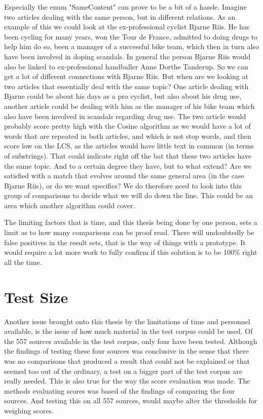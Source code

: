 Especially the enum "SameContent" can prove to be a bit of a hassle. Imagine two articles dealing with the same person, but in different relations. As an example of this we could look at the ex-professional cyclist Bjarne Riis. He has been cycling for many years, won the Tour de France, admitted to doing drugs to help him do so, been a manager of a successful bike team, which then in turn also have been involved in doping scandals. In general the person Bjarne Riis would also be linked to ex-professional handballer Anne Dorthe Tanderup. So we can get a lot of different connections with Bjarne Riis. But when are we looking at two articles that essentially deal with the same topic? One article dealing with Bjarne could be about his days as a pro cyclist, but also about his drug use, another article could be dealing with him as the manager of his bike team which also have been involved in scandals regarding drug use. The two article would probably score pretty high with the Cosine algorithm as we would have a lot of words that are repeated in both articles, and which is not stop words, and then score low on the LCS, as the articles would have little text in common (in terms of substrings). That could indicate right off the bat that these two articles have the same topic. And to a certain degree they have, but to what extend? Are we satisfied with a match that evolves around the same general area (in the case Bjarne Riis), or do we want specifics? We do therefore need to look into this group of comparisons to decide what we will do down the line. This could be an area which another algorithm could cover.

The limiting factors that is time, and this thesis being done by one person, sets a limit as to how many comparisons can be proof read. There will undoubtedly be false positives in the result sets, that is the way of things with a prototype. It would require a lot more work to fully confirm if this solution is to be 100\% right all the time.

\section{Test Size}
Another issue brought onto this thesis by the limitations of time and personnel available, is the issue of how much material in the test corpus could be used. Of the 557 sources available in the test corpus, only four have been tested. Although the findings of testing these four sources was conclusive in the sense that there was no comparisons that produced a result that could not be explained or that seemed too out of the ordinary, a test on a bigger part of the test corpus are really needed. This is also true for the way the score evaluation was made. The methods evaluating scores was based of the findings of comparing the four sources. And testing this on all 557 sources, would maybe alter the thresholds for weighing scores.

